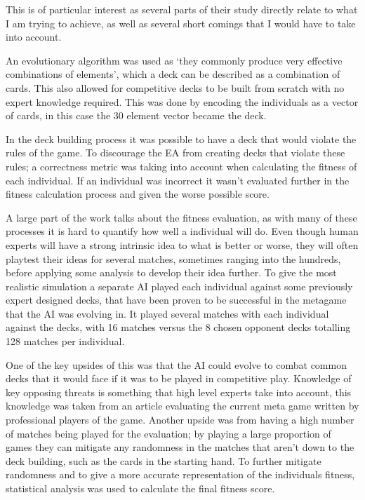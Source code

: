 \documentclass[a4paper]{article}
\begin{document}
This is of particular interest as several parts of their study directly relate to what I am trying to achieve, as well as several short comings that I would have to take into account.
\par
An evolutionary algorithm was used as `they commonly produce very effective combinations of elements', which a deck can be described as a combination of cards.
This also allowed for competitive decks to be built from scratch with no expert knowledge required.
This was done by encoding the individuals as a vector of cards, in this case the 30 element vector became the deck.
\par
In the deck building process it was possible to have a deck that would violate the rules of the game.
To discourage the EA from creating decks that violate these rules; a correctness metric was taking into account when calculating the fitness of each individual.
If an individual was incorrect it wasn't evaluated further in the fitness calculation process and given the worse possible score.
\\ \par
A large part of the work talks about the fitness evaluation, as with many of these processes it is hard to quantify how well a individual will do.
Even though human experts will have a strong intrinsic idea to what is better or worse, they will often playtest their ideas for several matches, sometimes ranging into the hundreds, before applying some analysis to develop their idea further.
To give the most realistic simulation a separate AI played each individual against some previously expert designed decks, that have been proven to be successful in the metagame that the AI was evolving in.
It played several matches with each individual against the decks, with 16 matches versus the 8 chosen opponent decks totalling 128 matches per individual.
\par
One of the key upsides of this was that the AI could evolve to combat common decks that it would face if it was to be played in competitive play.
Knowledge of key opposing threats is something that high level experts take into account, this knowledge was taken from an article evaluating the current meta game written by professional players of the game.
Another upside was from having a high number of matches being played for the evaluation; by playing a large proportion of games they can mitigate any randomness in the matches that aren't down to the deck building, such as the cards in the starting hand.
To further mitigate randomness and to give a more accurate representation of the individuals fitness, statistical analysis was used to calculate the final fitness score.
\end{document}
